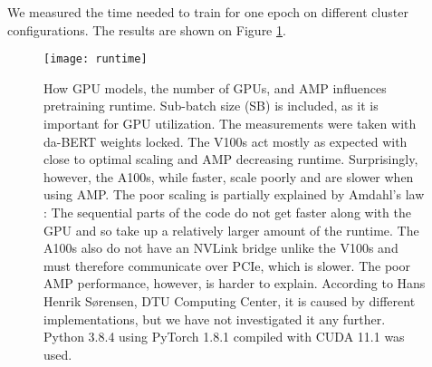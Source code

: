 \documentclass[main.tex]{subfiles}
\begin{document}
We measured the time needed to train for one epoch on different cluster configurations.
The results are shown on Figure \ref{fig:runtime}.
\begin{figure}
    \centering
    \texttt{[image: runtime]}
    \caption{
        How GPU models, the number of GPUs, and AMP influences pretraining runtime.
        Sub-batch size (SB) is included, as it is important for GPU utilization.
        The measurements were taken with da-BERT weights locked.
        The V100s act mostly as expected with close to optimal scaling and AMP decreasing runtime.
        Surprisingly, however, the A100s, while faster, scale poorly and are slower when using AMP.
        The poor scaling is partially explained by Amdahl's law \cite{klein2011amdahl}: The sequential parts of the code do not get faster along with the GPU and so take up a relatively larger amount of the runtime.
        The A100s also do not have an NVLink bridge unlike the V100s and must therefore communicate over PCIe, which is slower.
        The poor AMP performance, however, is harder to explain.
        According to Hans Henrik Sørensen, DTU Computing Center, it is caused by different  implementations, but we have not investigated it any further.
        Python 3.8.4 using PyTorch 1.8.1 compiled with CUDA 11.1 was used.
    }
    \label{fig:runtime}
\end{figure}\noindent
\end{document}
